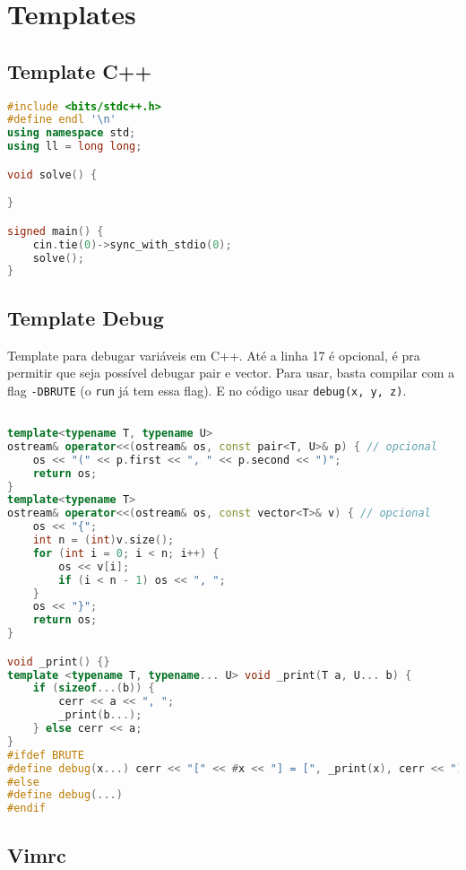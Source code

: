 \chapter{Templates}

\section{Template C++}

\begin{lstlisting}[language=C++]
#include <bits/stdc++.h>
#define endl '\n'
using namespace std;
using ll = long long;

void solve() {

}

signed main() {
    cin.tie(0)->sync_with_stdio(0);
    solve();
}
\end{lstlisting}

\section{Template Debug}

Template para debugar variáveis em C++. Até a linha 17 é opcional, é pra permitir que seja possível debugar pair e vector.
Para usar, basta compilar com a flag \texttt{-DBRUTE} (o \texttt{run} já tem essa flag). E no código usar \texttt{debug(x, y, z)}.

\begin{lstlisting}[language=C++]

template<typename T, typename U> 
ostream& operator<<(ostream& os, const pair<T, U>& p) { // opcional
    os << "(" << p.first << ", " << p.second << ")";
    return os;
}
template<typename T> 
ostream& operator<<(ostream& os, const vector<T>& v) { // opcional
    os << "{";
    int n = (int)v.size();
    for (int i = 0; i < n; i++) {
        os << v[i];
        if (i < n - 1) os << ", ";
    }
    os << "}";
    return os;
}

void _print() {}
template <typename T, typename... U> void _print(T a, U... b) {
    if (sizeof...(b)) {
        cerr << a << ", ";
        _print(b...);
    } else cerr << a;
}
#ifdef BRUTE
#define debug(x...) cerr << "[" << #x << "] = [", _print(x), cerr << "]" << endl
#else
#define debug(...)
#endif
\end{lstlisting}

\section{Vimrc}

